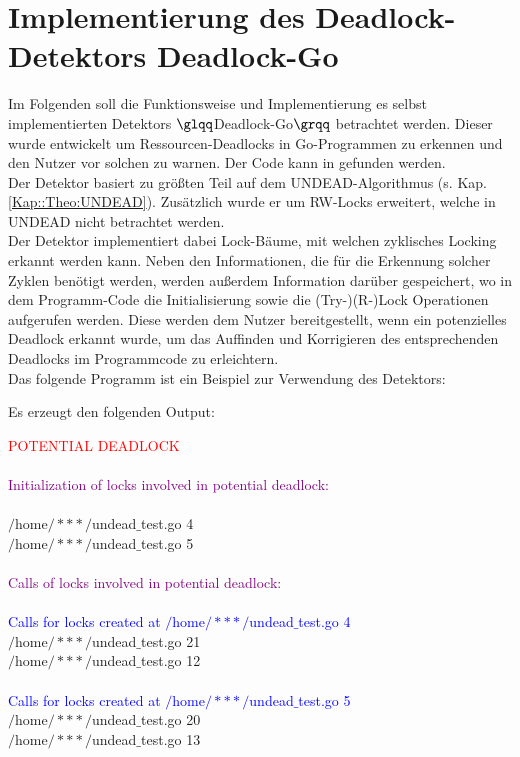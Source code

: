 \chapter{Implementierung des Deadlock-Detektors \glqq Deadlock-Go \grqq} \label{Kap::Implementaion}
Im Folgenden soll die Funktionsweise und Implementierung es selbst implementierten 
Detektors $\glqq$Deadlock-Go$\grqq$ 
betrachtet werden. Dieser wurde entwickelt um Ressourcen-Deadlocks in Go-Programmen
zu erkennen und den Nutzer vor solchen zu warnen. Der Code kann in 
\cite{implementation} gefunden werden.\\
Der Detektor basiert zu größten Teil auf dem UNDEAD-Algorithmus (s. Kap. \ref{Kap::Theo:UNDEAD}). 
Zusätzlich wurde er um RW-Locks
erweitert, welche in UNDEAD nicht betrachtet werden.\\
Der Detektor implementiert dabei Lock-Bäume, mit welchen zyklisches Locking 
erkannt werden kann. Neben den Informationen, die für die Erkennung solcher 
Zyklen benötigt werden, werden außerdem Information darüber gespeichert, wo in dem 
Programm-Code die Initialisierung sowie die (Try-)(R-)Lock Operationen aufgerufen werden. 
Diese werden dem Nutzer bereitgestellt, wenn ein potenzielles 
Deadlock erkannt wurde, um das Auffinden und Korrigieren des entsprechenden Deadlocks 
im Programmcode zu erleichtern.\\
Das folgende Programm ist ein Beispiel zur Verwendung des Detektors:
\begin{figure}[H]
  
\end{figure}
\newpage
Es erzeugt den folgenden Output:

\begin{mdframed}[leftmargin=10pt,rightmargin=10pt]
\textcolor{red}{POTENTIAL DEADLOCK}\\\\
\textcolor{purple}{Initialization of locks involved in potential deadlock:}\\\\
$/$home$/***/$undead$\_$test.go 4\\
$/$home$/***/$undead$\_$test.go 5\\\\
\textcolor{purple}{Calls of locks involved in potential deadlock:}\\\\
\textcolor{blue}{Calls for locks created at $/$home$/***/$undead$\_$test.go 4}\\
$/$home$/***/$undead$\_$test.go 21\\
$/$home$/***/$undead$\_$test.go 12\\\\
\textcolor{blue}{Calls for locks created at $/$home$/***/$undead$\_$test.go 5}\\
$/$home$/***/$undead$\_$test.go 20\\
$/$home$/***/$undead$\_$test.go 13\
\end{mdframed}


